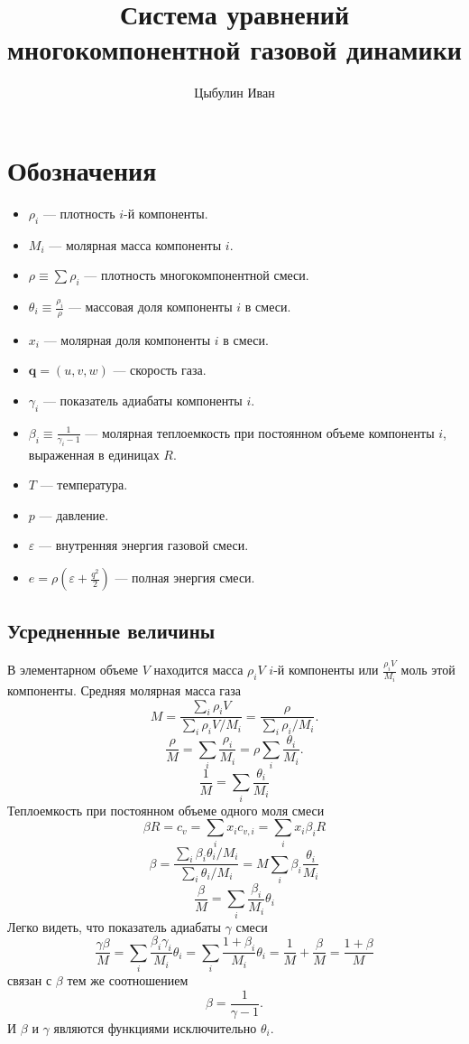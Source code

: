\documentclass[12pt]{article}
\author{Цыбулин Иван}
\title{Система уравнений многокомпонентной газовой динамики}
\newcommand{\bvec}[1]{\boldsymbol{\mathbf{#1}}}
\begin{document}
\maketitle
\section{Обозначения}
\begin{itemize}
\item $\rho_i$ --- плотность $i$-й компоненты.
\item $M_i$ --- молярная масса компоненты $i$.
\item $\rho \equiv \sum \rho_i$ --- плотность многокомпонентной смеси.
\item $\theta_i \equiv \frac{\rho_i}{\rho}$ --- массовая доля компоненты $i$ в смеси.
\item $x_i$ --- молярная доля компоненты $i$ в смеси.
\item $\bvec q = (u, v, w)$ --- скорость газа.
\item $\gamma_i$ --- показатель адиабаты компоненты $i$.
\item $\beta_i \equiv \frac{1}{\gamma_i - 1}$ --- молярная теплоемкость при постоянном объеме 
компоненты $i$, выраженная в единицах $R$.
\item $T$ --- температура.
\item $p$ --- давление.
\item $\varepsilon$ --- внутренняя энергия газовой смеси.
\item $e = \rho \left(\varepsilon + \frac{q^2}{2}\right)$ --- полная энергия смеси.
\end{itemize}

\subsection{Усредненные величины}
В элементарном объеме $V$ находится масса $\rho_i V$ $i$-й компоненты или $\frac{\rho_i V}{M_i}$ 
моль этой компоненты. Средняя молярная масса газа
\[
M = \frac{\sum_i \rho_i V}{\sum_i \rho_i V / M_i} = \frac{\rho}{\sum_i \rho_i / M_i}.
\]
\[
\frac{\rho}{M} = \sum_i \frac{\rho_i}{M_i} = \rho\sum_i\frac{\theta_i}{M_i}.
\]
\[
\frac{1}{M} = \sum_i \frac{\theta_i}{M_i}
\]
Теплоемкость при постоянном объеме одного моля смеси
\[
\beta R = c_v = \sum_i x_i c_{v,i}
= \sum_i x_i \beta_i R
\]
\[
\beta = \frac{\sum_i \beta_i \theta_i / M_i}{\sum_i \theta_i / M_i} = 
M \sum_i \beta_i \frac{\theta_i}{M_i}
\]
\[
\frac{\beta}{M} = \sum_i \frac{\beta_i}{M_i} \theta_i
\]
Легко видеть, что показатель адиабаты $\gamma$ смеси
\[
\frac{\gamma \beta}{M} = \sum_i \frac{\beta_i \gamma_i}{M_i} \theta_i = 
\sum_i \frac{1 + \beta_i}{M_i} \theta_i = \frac{1}{M} + \frac{\beta}{M} = \frac{1+\beta}{M}
\]
связан с $\beta$ тем же соотношением
\[
\beta = \frac{1}{\gamma - 1}.
\]
И $\beta$ и $\gamma$ являются функциями исключительно $\theta_i$.
\end{document}
